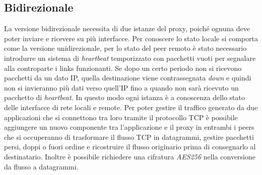 \subsection{Bidirezionale}
La versione bidirezionale necessita di due istanze del proxy, poiché ognuna deve poter inviare e ricevere su più interfacce. Per conoscere lo stato locale si comporta come la versione unidirezionale, per lo stato del peer remoto è stato necessario introdurre un sistema di {\em heartbeat} temporizzato con pacchetti vuoti per segnalare alla controparte i links funzionanti. Se dopo un certo periodo non si ricevono pacchetti da un dato IP, quella destinazione viene contrassegnata {\em down} e quindi non si invieranno più dati verso quell'IP fino a quando non sarà ricevuto un pacchetto di {\em heartbeat}. In questo modo ogni istanza è a conoscenza dello stato delle interfacce di rete locali e remote. Per poter gestire il traffico generato da due applicazioni che si connettono tra loro tramite il protocollo TCP è possibile aggiungere un nuovo componente tra l'applicazione e il proxy in entrambi i peers che si occuperanno di trasformare il flusso TCP in datagrammi, gestire pacchetti persi, doppi o fuori ordine e ricostruire il flusso originario prima di consegnarlo al destinatario. Inoltre è possibile richiedere una cifratura {\em AES256} nella conversione da flusso a datagrammi.\\
